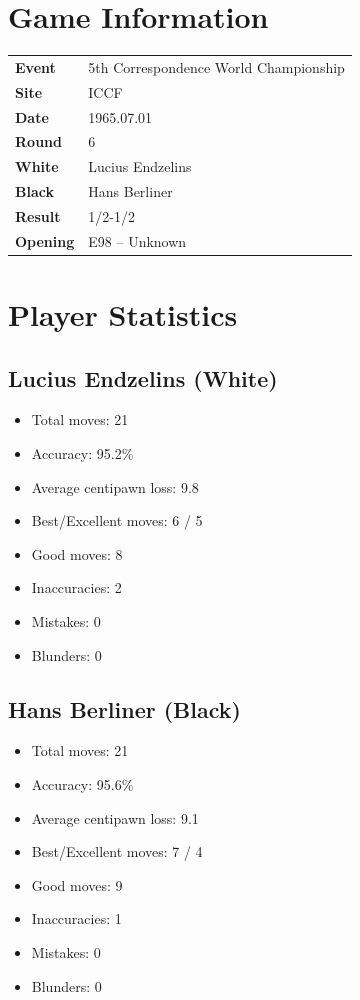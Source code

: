 \documentclass[11pt]{book}
\begin{document}
\section{Game Information}
\begin{tabular}{ll}
\textbf{Event} & 5th Correspondence World Championship \\
\textbf{Site} & ICCF \\
\textbf{Date} & 1965.07.01 \\
\textbf{Round} & 6 \\
\textbf{White} & Lucius Endzelins \\
\textbf{Black} & Hans Berliner \\
\textbf{Result} & 1/2-1/2 \\
\textbf{Opening} & E98 -- Unknown \\
\end{tabular}

\section{Player Statistics}

\subsection{Lucius Endzelins (White)}
\begin{itemize}
\item Total moves: 21
\item Accuracy: 95.2\%
\item Average centipawn loss: 9.8
\item Best/Excellent moves: 6 / 5
\item Good moves: 8
\item Inaccuracies: 2
\item Mistakes: 0
\item Blunders: 0
\end{itemize}

\subsection{Hans Berliner (Black)}
\begin{itemize}
\item Total moves: 21
\item Accuracy: 95.6\%
\item Average centipawn loss: 9.1
\item Best/Excellent moves: 7 / 4
\item Good moves: 9
\item Inaccuracies: 1
\item Mistakes: 0
\item Blunders: 0
\end{itemize}
\end{document}
